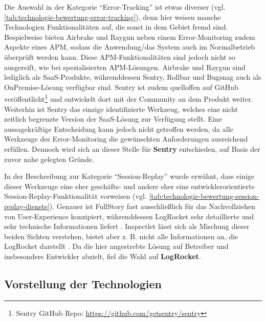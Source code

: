 

Die Auswahl in der Kategorie \enquote{Error-Tracking} ist etwas diverser (vgl. \autoref{tab:technologie-bewertung-error-tracking}), denn hier weisen manche Technologien Funktionalitäten auf, die sonst in dem Gebiet fremd sind. Bespielweise bieten Airbrake und Raygun neben einem Error-Monitoring zudem Aspekte eines APM, sodass die Anwendung/das System auch im Normalbetrieb überprüft werden kann. Diese APM-Funktionalitäten sind jedoch nicht so ausgereift, wie bei spezialisierten APM-Lösungen. Airbrake und Raygun sind lediglich als SaaS-Produkte, währenddessen Sentry, Rollbar und Bugsnag auch als OnPremise-Lösung verfügbar sind. Sentry ist zudem quelloffen auf GitHub \cite{GitHub} veröffentlicht\footnote{Sentry GitHub Repo: \url{https://github.com/getsentry/sentry}} und entwickelt dort mit der Community an dem Produkt weiter. Weiterhin ist Sentry das einzige identifizierte Werkzeug, welches eine nicht zeitlich begrenzte Version der SaaS-Lösung zur Verfügung stellt. Eine aussagekräftige Entscheidung kann jedoch nicht getroffen werden, da alle Werkzeuge des Error-Monitoring die gewünschten Anforderungen ausreichend erfüllen. Dennoch wird sich an dieser Stelle für \textbf{Sentry} entschieden, auf Basis der zuvor nahe gelegten Gründe.



In der Beschreibung zur Kategorie \enquote{Session-Replay} wurde erwähnt, dass einige dieser Werkzeuge eine eher geschäfts- und andere eher eine entwicklerorientierte Session-Replay-Funktionalität vorweisen (vgl. \autoref{tab:technologie-bewertung-session-replay-dienste}). Genauer ist FullStory fast ausschließlich für das Nachvollziehen von User-Experience konzipiert, währenddessen LogRocket sehr detaillierte und sehr technische Informationen liefert \cite{Webalyt}. Inspectlet lässt sich als Mischung dieser beiden Sichten verstehen, bietet aber z. B. nicht alle Informationen an, die LogRocket darstellt  \cite{Webalyt}. Da die hier angestrebte Lösung auf Betreiber und insbesondere Entwickler abzielt, fiel die Wahl auf \textbf{LogRocket}.



\subsection{Vorstellung der Technologien}

